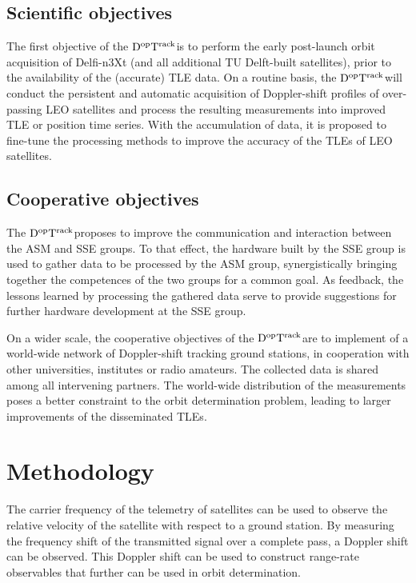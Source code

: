 \documentclass[11pt,a4paper,oneside]{article}
\newcommand{\GroundStationName}{${\rm D^{\rm op}T^{\rm rack}}$}
\begin{document}
\subsection{Scientific objectives}

The first objective of the \GroundStationName is to perform the early post-launch orbit acquisition of Delfi-n3Xt (and all additional TU Delft-built satellites), prior to the availability of the (accurate) \ac{TLE} data. On a routine basis, the \GroundStationName will conduct the persistent and automatic acquisition of Doppler-shift profiles of over-passing \ac{LEO} satellites and process the resulting measurements into improved \ac{TLE} or position time series. With the accumulation of data, it is proposed to fine-tune the processing methods to improve the accuracy of the \acp{TLE} of \ac{LEO} satellites.



\subsection{Cooperative objectives}

The \GroundStationName proposes to improve the communication and interaction between the \ac{ASM} and \ac{SSE} groups. To that effect, the hardware built by the \ac{SSE} group is used to gather data to be processed by the \ac{ASM} group, synergistically bringing together the competences of the two groups for a common goal. As feedback, the lessons learned by processing the gathered data serve to provide suggestions for further hardware development at the \ac{SSE} group.

On a wider scale, the cooperative objectives of the \GroundStationName are to implement of a world-wide network of Doppler-shift tracking ground stations, in cooperation with other universities, institutes or radio amateurs. The collected data is shared among all intervening partners. The world-wide distribution of the measurements poses a better constraint to the orbit determination problem, leading to larger improvements of the disseminated \acp{TLE}.



\section{Methodology}

The carrier frequency of the telemetry of satellites can be used to observe the relative velocity of the satellite with respect to a ground station. By measuring the frequency shift of the transmitted signal over a complete pass, a Doppler shift can be observed. This Doppler shift can be used to construct range-rate observables that further can be used in orbit determination.
\end{document}
